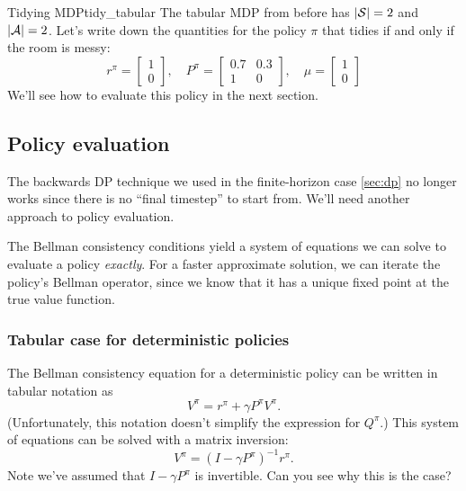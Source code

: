 \documentclass[../main/main]{subfiles}
\begin{document}
\begin{example}{Tidying MDP}{tidy_tabular}
    The tabular MDP from before has $|\S| = 2$ and $|\A| = 2$. Let's write down the quantities for the policy $\pi$ that tidies if and only if the room is messy:
    \[
        r^{\pi} = \begin{bmatrix} 1 \\ 0 \end{bmatrix}, \quad
        P^{\pi} = \begin{bmatrix} 0.7 & 0.3 \\ 1 & 0 \end{bmatrix}, \quad
        \mu = \begin{bmatrix} 1 \\ 0 \end{bmatrix}
    \]
    We'll see how to evaluate this policy in the next section.
\end{example}

\subsection{Policy evaluation}

The backwards DP technique we used in the finite-horizon case \eqref{sec:dp} no longer works since there is no ``final timestep'' to start from. We'll need another approach to policy evaluation.

The Bellman consistency conditions yield a system of equations we can solve to evaluate a policy \emph{exactly}. For a faster approximate solution, we can iterate the policy's Bellman operator, since we know that it has a unique fixed point at the true value function.


\subsubsection{Tabular case for deterministic policies}

The Bellman consistency equation for a deterministic policy can be written in tabular notation as
\[
    V^\pi = r^\pi + \gamma P^\pi V^\pi.
\]
(Unfortunately, this notation doesn't simplify the expression for $Q^\pi$.) This system of equations can be solved with a matrix inversion:
\begin{equation}
    V^\pi = (I - \gamma P^\pi)^{-1} r^\pi. \label{eq:matrix_inversion_pe}
\end{equation}
Note we've assumed that $I - \gamma P^\pi$ is invertible. Can you see why this is the case?
\end{document}
